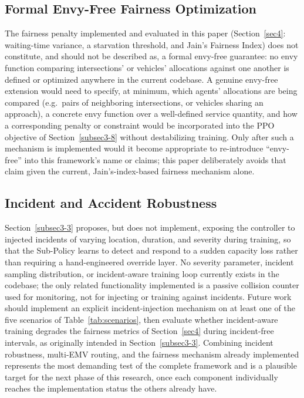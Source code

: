 \documentclass[3p,times]{elsarticle}
\theoremstyle{plain}
\theoremstyle{definition}
\begin{document}
\subsection{Formal Envy-Free Fairness Optimization}

The fairness penalty implemented and evaluated in this paper
(Section~\ref{sec4}: waiting-time variance, a starvation threshold, and
Jain's Fairness Index) does not constitute, and should not be
described as, a formal envy-free guarantee: no envy function comparing
intersections' or vehicles' allocations against one another is defined
or optimized anywhere in the current codebase. A genuine envy-free
extension would need to specify, at minimum, which agents' allocations
are being compared (e.g.\ pairs of neighboring intersections, or
vehicles sharing an approach), a concrete envy function over a
well-defined service quantity, and how a corresponding penalty or
constraint would be incorporated into the PPO objective of
Section~\ref{subsec3-8} without destabilizing training. Only after such
a mechanism is implemented would it become appropriate to re-introduce
``envy-free'' into this framework's name or claims; this paper
deliberately avoids that claim given the current, Jain's-index-based
fairness mechanism alone.

\subsection{Incident and Accident Robustness}

Section~\ref{subsec3-3} proposes, but does not implement, exposing the
controller to injected incidents of varying location, duration, and
severity during training, so that the Sub-Policy learns to detect and
respond to a sudden capacity loss rather than requiring a
hand-engineered override layer. No severity parameter, incident
sampling distribution, or incident-aware training loop currently exists
in the codebase; the only related functionality implemented is a
passive collision counter used for monitoring, not for injecting or
training against incidents. Future work should implement an explicit
incident-injection mechanism on at least one of the five scenarios of
Table~\ref{tab:scenarios}, then evaluate whether incident-aware
training degrades the fairness metrics of Section~\ref{sec4} during
incident-free intervals, as originally intended in
Section~\ref{subsec3-3}. Combining incident robustness, multi-EMV
routing, and the fairness mechanism already implemented represents the
most demanding test of the complete framework and is a plausible target
for the next phase of this research, once each component individually
reaches the implementation status the others already have.
\end{document}
